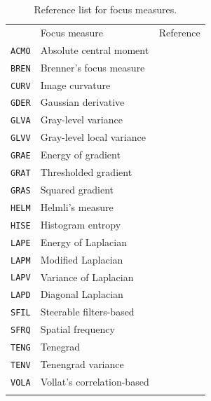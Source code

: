 \begin{table}[!tbh]
    \centering
    \caption{Reference list for focus measures.}
    \begin{tabular}{@{}llr@{}}
    \toprule
    & Focus measure & Reference \\
    \arrayrulecolor{black!30}\midrule
    \texttt{ACMO} & Absolute central moment & \cite{shirvaikar2004optimal} \\
    \texttt{BREN} & Brenner's focus measure & \cite{santos1997evaluation} \\
    \texttt{CURV} & Image curvature & \cite{helmli2001adaptive} \\
    \texttt{GDER} & Gaussian derivative & \cite{geusebroek2000robust} \\
    \texttt{GLVA} & Gray-level variance & \cite{krotkov1986range} \\
    \texttt{GLVV} & Gray-level local variance & \cite{pech2000diatom} \\
    \texttt{GRAE} & Energy of gradient & \cite{subbarao1992focusing} \\
    \texttt{GRAT} & Thresholded gradient & \cite{santos1997evaluation} \\
    \texttt{GRAS} & Squared gradient & \cite{eskicioglu1995image} \\
    \texttt{HELM} & Helmli's measure & \cite{helmli2001adaptive} \\
    \texttt{HISE} & Histogram entropy & \cite{krotkov1986range} \\
    \texttt{LAPE} & Energy of Laplacian & \cite{subbarao1992focusing} \\
    \texttt{LAPM} & Modified Laplacian & \cite{nayar1990shape} \\
    \texttt{LAPV} & Variance of Laplacian & \cite{pech2000diatom} \\
    \texttt{LAPD} & Diagonal Laplacian & \cite{thelen2008improvements}  \\
    \texttt{SFIL} & Steerable filters-based & \cite{minhas20093d} \\
    \texttt{SFRQ} & Spatial frequency & \cite{eskicioglu1995image} \\
    \texttt{TENG} & Tenegrad & \cite{krotkov1986range} \\
    \texttt{TENV} & Tenengrad variance & \cite{pech2000diatom} \\
    \texttt{VOLA} & Vollat's correlation-based & \cite{santos1997evaluation} \\
    \arrayrulecolor{black}\bottomrule
    \end{tabular}
\end{table}
